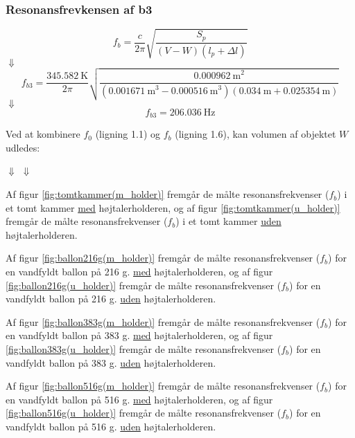\subsubsection{Resonansfrevkensen af b3} 
\hspace{1,5cm}
\begin{equation}
		f_{b} = \frac{c}{2\pi}\sqrt{\frac{S_{p}}{(V-W)(l_{p}+\Delta l)}}
	\end{equation}
$\Downarrow$
\begin{equation}
		f_{b3} = \frac{{\SI{345,582}{\kelvin}}}{2\pi}\sqrt{\frac{{\SI{0,000962}{\meter}^2}}{({\SI{0,001671}{\meter}^3}-{\SI{0,000516}{\meter}^3})({\SI{0,034}{\meter}}+ {\SI{0.025354}{\meter}})}}	
\end{equation}
$\Downarrow$
\begin{equation}
		f_{b3} = {\SI{206,036}{\hertz}}
\end{equation}





Ved at kombinere $f_{0}$ (ligning 1.1) og $f_{b}$ (ligning 1.6), kan volumen af objektet $W$ udledes: 

\Wudl
$\Downarrow$
\Wudled
$\Downarrow$
\W
\vspace{5mm}  



Af figur \ref{fig:tomtkammer(m_holder)} fremgår de målte resonansfrekvenser ($f_{b}$) i et tomt kammer \underline{med} højtalerholderen, og af figur \ref{fig:tomtkammer(u_holder)} fremgår de målte resonansfrekvenser ($f_{b}$) i et tomt kammer \underline{uden} højtalerholderen. 

Af figur \ref{fig:ballon216g(m_holder)} fremgår de målte resonansfrekvenser ($f_{b}$) for en vandfyldt ballon på 216 g. \underline{med} højtalerholderen, og af figur \ref{fig:ballon216g(u_holder)} fremgår de målte resonansfrekvenser ($f_{b}$) for en vandfyldt ballon på 216 g. \underline{uden} højtalerholderen.  

Af figur \ref{fig:ballon383g(m_holder)} fremgår de målte resonansfrekvenser ($f_{b}$) for en vandfyldt ballon på 383 g. \underline{med} højtalerholderen, og af figur \ref{fig:ballon383g(u_holder)} fremgår de målte resonansfrekvenser ($f_{b}$) for en vandfyldt ballon på 383 g. \underline{uden} højtalerholderen.  

Af figur \ref{fig:ballon516g(m_holder)} fremgår de målte resonansfrekvenser ($f_{b}$) for en vandfyldt ballon på 516 g. \underline{med} højtalerholderen, og af figur \ref{fig:ballon516g(u_holder)} fremgår de målte resonansfrekvenser ($f_{b}$) for en vandfyldt ballon på 516 g. \underline{uden} højtalerholderen.  

